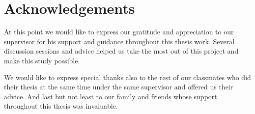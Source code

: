 \chapter*{Acknowledgements} 
\mbox{}\par
At this point we would like to express our gratitude and appreciation to our supervisor for his support and guidance throughout this thesis work.
Several discussion sessions and advice helped us take the most out of this project and make this study possible. 
\par
We would like to express special thanks also to the rest of our classmates who did their thesis at the same time under the same supervisor and offered us their advice. And last but not least to our family and friends whose support throughout this thesis was invaluable.  